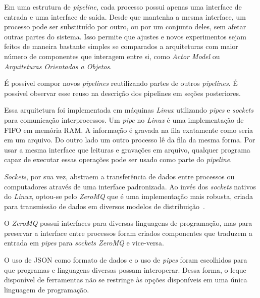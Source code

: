 \documentclass[12pt,a4paper]{article}
\begin{document}

Em uma estrutura de \textit{pipeline}, cada processo possui apenas uma interface de entrada e uma interface de saída. Desde que mantenha a mesma interface, um processo pode ser substituído por outro, ou por um conjunto deles, sem afetar outras partes do sistema. Isso permite que ajustes e novos experimentos sejam feitos de maneira bastante simples se comparados a arquiteturas com maior número de componentes que interagem entre si, como \textit{Actor Model} ou \textit{Arquiteturas Orientadas a Objetos}.

É possível compor novos \textit{pipelines} reutilizando partes de outros \textit{pipelines}. É possível observar esse reuso na descrição dos pipelines em seções posteriores.

Essa arquitetura foi implementada em máquinas \textit{Linux} utilizando \textit{pipes} e \textit{sockets} para comunicação interprocessos. Um \textit{pipe} no \textit{Linux} é uma implementação de FIFO em memória RAM. A informação é gravada na fila exatamente como seria em um arquivo. Do outro lado um outro processo lê da fila da mesma forma. Por usar a mesma interface que leituras e gravações em arquivo, qualquer programa capaz de executar essas operações pode ser usado como parte do \textit{pipeline}.

\textit{Sockets}, por sua vez, abstraem a transferência de dados entre processos ou computadores através de uma interface padronizada. Ao invés dos \textit{sockets} nativos do \textit{Linux}, optou-se pelo \textit{ZeroMQ} que é uma implementação mais robusta, criada para transmissão de dados em diversos modelos de distribuição~\cite{Hintjens2013-tz}.

O \textit{ZeroMQ} possui interfaces para diversas linguagens de programação, mas para preservar a interface entre processos foram criados componentes que traduzem a entrada em \textit{pipes} para \textit{sockets ZeroMQ} e vice-versa.

O uso de JSON como formato de dados e o uso de \textit{pipes} foram escolhidos para que programas e linguagens diversas possam interoperar. Dessa forma, o leque disponível de ferramentas não se restringe às opções disponíveis em uma única linguagem de programação.
\end{document}

